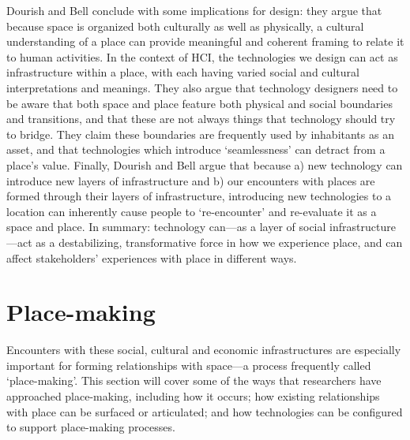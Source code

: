 Dourish and Bell conclude with some implications for design: they argue that because space is organized both culturally as well as physically, a cultural understanding of a place can provide meaningful and coherent framing to relate it to human activities. In the context of HCI, the technologies we design can act as infrastructure within a place, with each having varied social and cultural interpretations and meanings. They also argue that technology designers need to be aware that both space and place feature both physical and social boundaries and transitions, and that these are not always things that technology should try to bridge. They claim these boundaries are frequently used by inhabitants as an asset, and that technologies which introduce `seamlessness' can detract from a place's value. Finally, Dourish and Bell argue that because a) new technology can introduce new layers of infrastructure and b) our encounters with places are formed through their layers of infrastructure, introducing new technologies to a location can inherently cause people to `re-encounter' and re-evaluate it as a space and place. In summary: technology can---as a layer of social infrastructure---act as a destabilizing, transformative force in how we experience place, and can affect stakeholders' experiences with place in different ways.

\section{Place-making}

Encounters with these social, cultural and economic infrastructures are especially important for forming relationships with space---a process frequently called `place-making'. This section will cover some of the ways that researchers have approached place-making, including how it occurs; how existing relationships with place can be surfaced or articulated; and how technologies can be configured to support place-making processes.

